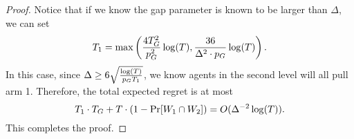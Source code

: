 \begin{proof}
Notice that if we know the gap parameter is known to be larger than
$\Delta$, we can set
\[
T_1 = \max\left( \frac{4T_G^2}{p_G^2}\log(T), \frac{36 }{\Delta^2 \cdot p_G} \log(T) \right).
\]
In this case, since $\Delta \geq 6 \sqrt{\frac{\log(T)}{p_G T_1 }}$, we know agents in the second level will all pull arm 1. Therefore, the total expected regret is at most
\[
T_1 \cdot T_G + T \cdot (1- \Pr[W_1 \cap W_2]) = O(\Delta^{-2} \log(T)).
\]
This completes the proof.
\end{proof}
